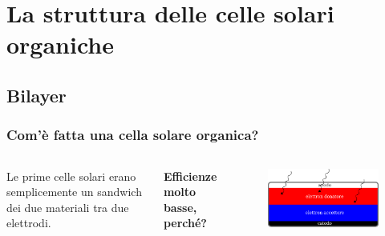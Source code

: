\documentclass{beamer}
\begin{document}
\section{La struttura delle celle solari organiche}
\subsection{Bilayer}
\begin{frame}%
\frametitle{Com'è fatta una cella solare organica?}
\begin{columns}
Le prime celle solari erano semplicemente un sandwich dei due materiali tra due elettrodi.
\bigskip

\textbf{Efficienze molto basse, perché?}
\begin{figure}\centering \includegraphics[width=1\textwidth]{img/bilayer-1-colori.pdf}\end{figure}
\end{columns}
\end{frame}
\end{document}
